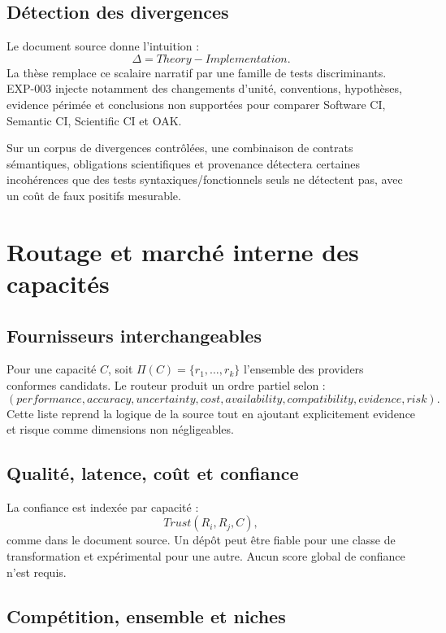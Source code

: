 \section{Détection des divergences}

Le document source donne l'intuition :
\[
\Delta=Theory-Implementation.
\]
La thèse remplace ce scalaire narratif par une famille de tests discriminants. EXP-003 injecte notamment des changements d'unité, conventions, hypothèses, evidence périmée et conclusions non supportées pour comparer Software CI, Semantic CI, Scientific CI et OAK.

\begin{conjecture}
Sur un corpus de divergences contrôlées, une combinaison de contrats sémantiques, obligations scientifiques et provenance détectera certaines incohérences que des tests syntaxiques/fonctionnels seuls ne détectent pas, avec un coût de faux positifs mesurable.
\end{conjecture}

\chapter{Routage et marché interne des capacités}

\section{Fournisseurs interchangeables}

Pour une capacité $C$, soit $\Pi(C)=\{r_1,\ldots,r_k\}$ l'ensemble des providers conformes candidats. Le routeur produit un ordre partiel selon :
\[
(performance,accuracy,uncertainty,cost,availability,compatibility,evidence,risk).
\]
Cette liste reprend la logique de la source tout en ajoutant explicitement evidence et risque comme dimensions non négligeables.

\section{Qualité, latence, coût et confiance}

La confiance est indexée par capacité :
\[
Trust(R_i,R_j,C),
\]
comme dans le document source. Un dépôt peut être fiable pour une classe de transformation et expérimental pour une autre. Aucun score global de confiance n'est requis.

\section{Compétition, ensemble et niches}

